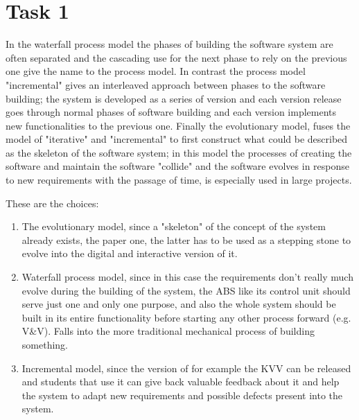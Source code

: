 \chapter{Task 1}
\begin{parlist}
	\item In the waterfall process model the phases of building the software system are often separated and the cascading use for the next phase to rely on the previous one give the name to the process model. In contrast the process model "incremental" gives an interleaved approach between phases to the software building; the system is developed as a series of version and each version release goes through normal phases of software building and each version implements new functionalities to the previous one. Finally the evolutionary model, fuses the model of "iterative" and "incremental" to first construct what could be described as the skeleton of the software system; in this model the processes of creating the software and maintain the software "collide" and the software evolves in response to new requirements with the passage of time, is especially used in large projects. \cite{Sommerville2015}\cite{unstopEvolutionaryModel}
	\item These are the choices:
		\begin{enumerate}
			\item The evolutionary model, since a "skeleton" of the concept of the system already exists, the paper one, the latter has to be used as a stepping stone to evolve into the digital and interactive version of it.
			\item Waterfall process model, since in this case the requirements don't really much evolve during the building of the system, the ABS like its control unit should serve just one and only one purpose, and also the whole system should be built in its entire functionality before starting any other process forward (e.g. V\&V). Falls into the more traditional mechanical process of building something.
			\item Incremental model, since the version of for example the KVV can be released and students that use it can give back valuable feedback about it and help the system to adapt new requirements and possible defects present into the system.\cite{Sommerville2015}
		\end{enumerate}
\end{parlist}